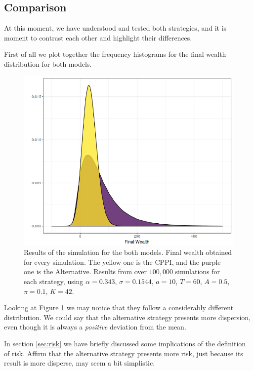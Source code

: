 \subsection{Comparison}

At this moment, we have understood and tested both strategies, and it is moment to contrast each other and highlight their differences.

First of all we plot together the frequency histograms for the final wealth distribution for both models.

\begin{figure}[h]
    \centering
    \includegraphics[scale=0.65]{./images/fw_both.png}
    \caption{Results of the simulation for the both models. Final wealth obtained for every simulation. The yellow one is the CPPI, and the purple one is the Alternative. Results from over $100,000$ simulations for each strategy, using $\alpha = 0.343$, $\sigma = 0.1544$, $a = 10$, $T = 60$, $A = 0.5$, $\pi = 0.1$, $K = 42$.}
    \label{fig:both_fw}
\end{figure}

Looking at Figure \ref{fig:both_fw} we may notice that they follow a considerably different distribution. We could say that the alternative strategy presents more dispersion, even though it is always a \textit{positive} deviation from the mean.

In section \ref{sec:risk} we have briefly discussed some implications of the definition of risk. Affirm that the alternative strategy presents more risk, just because its result is more disperse, may seem a bit simplistic.

